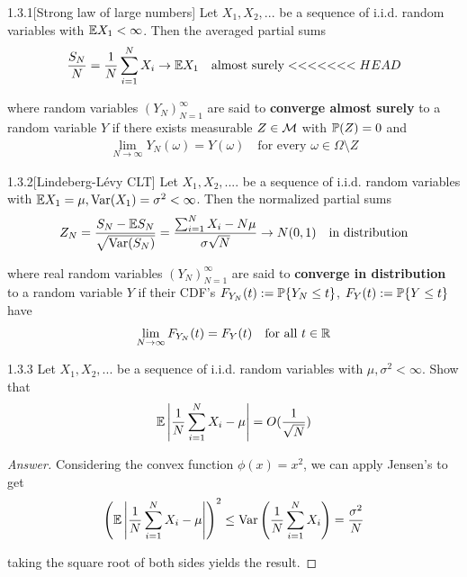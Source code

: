\begin{thm}{1.3.1}[Strong law of large numbers]\label{1.3.1}
Let $X_1, X_2,...$ be a sequence of i.i.d. random variables with $\E X_1 < \infty$. Then the averaged partial sums
\begin{align*}
    \frac {S_N} {N} = \frac 1 N \sum_{i=1}^N X_i \to \E X_1 \quad\text{almost surely}
<<<<<<< HEAD
\end{align*}

where random variables $(Y_N)_{N=1}^\infty$ are said to \textbf{converge almost surely} to a random variable $Y$ if there exists measurable $Z \in \M$ with $\P (Z) = 0$ and
\begin{align*}
    \lim_{N\to\infty}Y_N(\omega) = Y(\omega) \quad\text{for every $\omega \in \Omega \setminus Z$}
\end{align*}
\end{thm}

\begin{thm}{1.3.2}[Lindeberg-Lévy CLT]\label{1.3.2}
Let $X_1, X_2, ....$ be a sequence of i.i.d. random variables with $\E X_1 = \mu, \Var(X_1) = \sigma^2 < \infty$. Then the normalized partial sums
\begin{align*}
Z_N =\frac {S_N - \E S_N} {\sqrt{\Var(S_N)}}= \frac{\sum_{i=1}^N X_i - N\mu}{\sigma\sqrt{N}} \to N(0,1) \quad\text{in distribution}
\end{align*}

where real random variables $(Y_N)_{N=1}^\infty$ are said to \textbf{converge in distribution} to a random variable $Y$ if their CDF's $F_{Y_N}(t) := \P \{Y_N \leq t\}$, $F_Y(t):= \P \{Y \leq t\}$ have
\begin{align*}
    \lim_{N\to\infty}F_{Y_N}(t) = F_Y(t) \quad\text{for all $t\in \R$}
\end{align*}
\end{thm}

\begin{ex}{1.3.3}\label{1.3.3} Let $X_1, X_2, ...$ be a sequence of i.i.d. random variables with $\mu, \sigma^2 < \infty$. Show that
\begin{align*}
    \E \l|\frac 1 N \sum_{i=1}^N X_i - \mu\r| = O(\frac 1 {\sqrt N})
\end{align*}
\end{ex}
\begin{proof}[Answer]
Considering the convex function $\phi(x) = x^2$, we can apply Jensen's to get
\begin{align*}
    \l(\E \l|\frac 1 N \sum_{i=1}^N X_i - \mu\r|\r)^2 \leq \Var\l(\frac 1 N \sum_{i=1}^N X_i\r) = \frac {\sigma^2} N
\end{align*}

taking the square root of both sides yields the result.
\end{proof}

